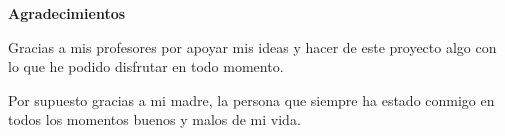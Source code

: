\newpage
\thispagestyle{empty}
\begin{center}
{\bf \Huge Agradecimientos}
\end{center}
\vspace{1cm}
\setlength{\baselineskip}{0.8cm}

Gracias a mis profesores por apoyar mis ideas y hacer de este proyecto algo con lo que he podido disfrutar en todo momento.

Por supuesto gracias a mi madre, la persona que siempre ha estado conmigo en todos los momentos buenos y malos de mi vida.
\textit{}